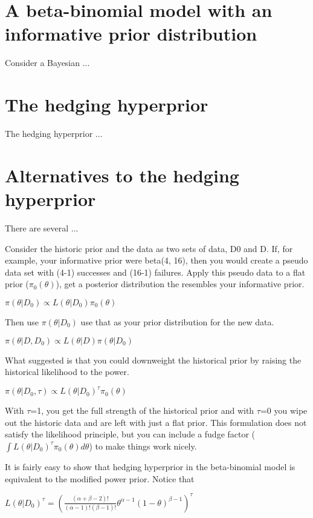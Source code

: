\documentclass[12pt]{article}
\begin{document}
\section{A beta-binomial model with an informative prior distribution}
\label{sec:bb}
Consider a Bayesian ...

\section{The hedging hyperprior}
\label{sec:hh}

The hedging hyperprior ...

\section{Alternatives to the hedging hyperprior}
\label{sec:alt}

There are several ...

Consider the historic prior and the data as two sets of data, D0 and D. If, for example, your informative prior were  beta(4, 16), then you would create a pseudo data set with (4-1) successes and (16-1) failures. Apply this pseudo data to a flat prior ($\pi_0(\theta)$), get a posterior distribution the resembles your informative prior.

$\pi(\theta | D_0) \propto L(\theta|D_0)\pi_0(\theta)$ 

Then use $\pi(\theta | D_0)$ use that as your prior distribution for the new data.

$\pi(\theta | D,D_0) \propto L(\theta|D)\pi(\theta | D_0)$  

What \cite{ibrahim03} suggested is that you could downweight the historical prior by raising the historical likelihood to the power.

$\pi(\theta | D_0, \tau) \propto L(\theta|D_0)^{\tau}\pi_0(\theta)$

With $\tau$=1, you get the full strength of the historical prior and with $\tau$=0 you wipe out the historic data and are left with just a flat prior. This formulation does not satisfy the likelihood principle, but you can include a fudge factor ($\int L(\theta|D_0)^{\tau}\pi_0(\theta)d\theta$) to make things work nicely.

It is fairly easy to show that hedging hyperprior in the beta-binomial model is equivalent to the modified power prior. Notice that

$L(\theta|D_0)^{\tau}=\left(\frac{(\alpha+\beta-2)!}{(\alpha-1)!(\beta-1)!}\theta^{\alpha-1}(1-\theta)^{\beta-1}\right)^\tau$
\end{document}

